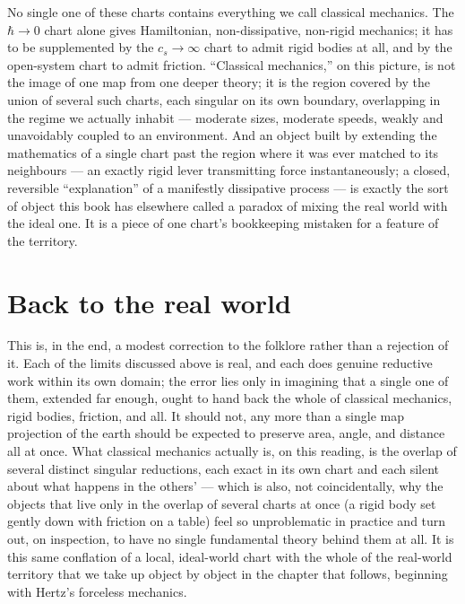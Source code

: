 \documentclass[11pt]{book}
\begin{document}
No single one of these charts contains everything we call classical mechanics. The $\hbar\to 0$ chart alone gives Hamiltonian, non-dissipative, non-rigid mechanics; it has to be supplemented by the $c_s\to\infty$ chart to admit rigid bodies at all, and by the open-system chart to admit friction. ``Classical mechanics,'' on this picture, is not the image of one map from one deeper theory; it is the region covered by the union of several such charts, each singular on its own boundary, overlapping in the regime we actually inhabit --- moderate sizes, moderate speeds, weakly and unavoidably coupled to an environment. And an object built by extending the mathematics of a single chart past the region where it was ever matched to its neighbours --- an exactly rigid lever transmitting force instantaneously; a closed, reversible ``explanation'' of a manifestly dissipative process --- is exactly the sort of object this book has elsewhere called a paradox of mixing the real world with the ideal one. It is a piece of one chart's bookkeeping mistaken for a feature of the territory.

\section{Back to the real world}

This is, in the end, a modest correction to the folklore rather than a rejection of it. Each of the limits discussed above is real, and each does genuine reductive work within its own domain; the error lies only in imagining that a single one of them, extended far enough, ought to hand back the whole of classical mechanics, rigid bodies, friction, and all. It should not, any more than a single map projection of the earth should be expected to preserve area, angle, and distance all at once. What classical mechanics actually is, on this reading, is the overlap of several distinct singular reductions, each exact in its own chart and each silent about what happens in the others' --- which is also, not coincidentally, why the objects that live only in the overlap of several charts at once (a rigid body set gently down with friction on a table) feel so unproblematic in practice and turn out, on inspection, to have no single fundamental theory behind them at all. It is this same conflation of a local, ideal-world chart with the whole of the real-world territory that we take up object by object in the chapter that follows, beginning with Hertz's forceless mechanics.
\end{document}
